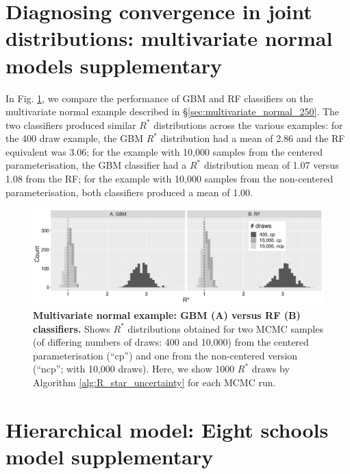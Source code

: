 \documentclass[ba]{imsart}
\numberwithin{equation}{section}
\theoremstyle{plain}
\begin{document}
	
	\begin{supplement}
		
		\section{Diagnosing convergence in joint distributions: multivariate normal models supplementary}\label{sec:multivariate_normal_supp}
		
		In Fig. \ref{fig:mvt_gbm_vs_rf}, we compare the performance of GBM and RF classifiers on the multivariate normal example described in \S\ref{sec:multivariate_normal_250}. The two classifiers produced similar $R^*$ distributions across the various examples: for the 400 draw example, the GBM $R^*$ distribution had a mean of 2.86 and the RF equivalent was 3.06; for the example with 10,000 samples from the centered parameterisation, the GBM classifier had a $R^*$ distribution mean of 1.07 versus 1.08 from the RF; for the example with 10,000 samples from the non-centered parameterisation, both classifiers produced a mean of 1.00.
		
		\begin{figure}[!htb]
			\centerline{\includegraphics[width=1\textwidth]{mvt_gbm_vs_rf.pdf}}
			\caption{\textbf{Multivariate normal example: GBM (A) versus RF (B) classifiers.} Shows $R^*$ distributions obtained for two MCMC samples (of differing numbers of draws: 400 and 10,000) from the centered parameterisation (``cp'') and one from the non-centered version (``ncp''; with 10,000 draws). Here, we show 1000 $R^*$ draws by Algorithm \ref{alg:R_star_uncertainty} for each MCMC run.}
			\label{fig:mvt_gbm_vs_rf}
		\end{figure}
		
		\section{Hierarchical model: Eight schools model supplementary}\label{sec:8_schools_supp}
		

\end{supplement}
\end{document}
